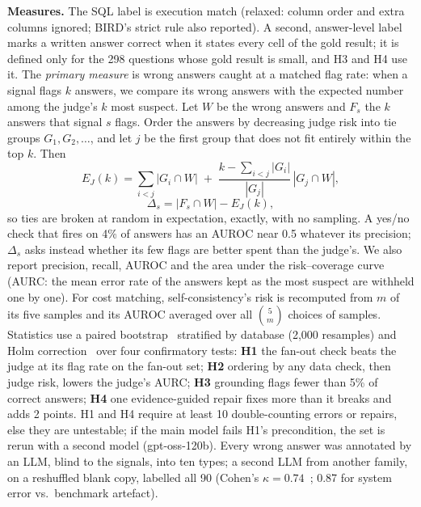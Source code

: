 \documentclass[conference]{IEEEtran}
\begin{document}
\textbf{Measures.} The SQL label is execution match (relaxed: column order and extra columns ignored;
BIRD's strict rule also reported). A second, answer-level label marks a written answer correct when it
states every cell of the gold result; it is defined only for the 298 questions whose gold result is
small, and H3 and H4 use it. The \emph{primary measure} is wrong answers caught at a matched
flag rate: when a signal flags $k$ answers, we compare its wrong answers with the expected number among
the judge's $k$ most suspect. Let $W$ be the wrong answers and $F_s$ the $k$ answers that signal $s$
flags. Order the answers by decreasing judge risk into tie groups $G_1, G_2, \dots$, and let $j$ be the
first group that does not fit entirely within the top $k$. Then
\begin{equation}
E_J(k)=\sum_{i<j}|G_i\cap W| \;+\; \frac{k-\sum_{i<j}|G_i|}{|G_j|}\,|G_j\cap W|,
\end{equation}
\begin{equation}
\Delta_s = |F_s\cap W| - E_J(k),
\end{equation}
so ties are broken at random in expectation, exactly, with no sampling. A yes/no check that fires on
4\% of answers has an AUROC near 0.5 whatever its precision; $\Delta_s$ asks instead whether its few
flags are better spent than the judge's. We also report precision, recall, AUROC and the area under the
risk--coverage curve (AURC: the mean error rate of the answers kept as the most suspect are withheld
one by one). For cost matching, self-consistency's risk is recomputed from $m$ of its five samples and
its AUROC averaged over all $\binom{5}{m}$ choices of samples. Statistics use a paired bootstrap~\cite{efron1979bootstrap}
stratified by database (2,000 resamples) and Holm correction~\cite{holm1979simple} over four confirmatory tests: \textbf{H1}
the fan-out check beats the judge at its flag rate on the fan-out set; \textbf{H2} ordering by any
data check, then judge risk, lowers the judge's AURC; \textbf{H3} grounding flags fewer than 5\% of
correct answers; \textbf{H4} one evidence-guided repair fixes more than it breaks and adds 2 points.
H1 and H4 require at least 10 double-counting errors or repairs, else they are untestable; if the main
model fails H1's precondition, the set is rerun with a second model (gpt-oss-120b). Every wrong answer
was annotated by an LLM, blind to the signals, into ten types; a second LLM from another family, on a
reshuffled blank copy, labelled all 90 (Cohen's $\kappa=0.74$~\cite{cohen1960coefficient}; 0.87 for system error vs.\ benchmark artefact).
\end{document}
